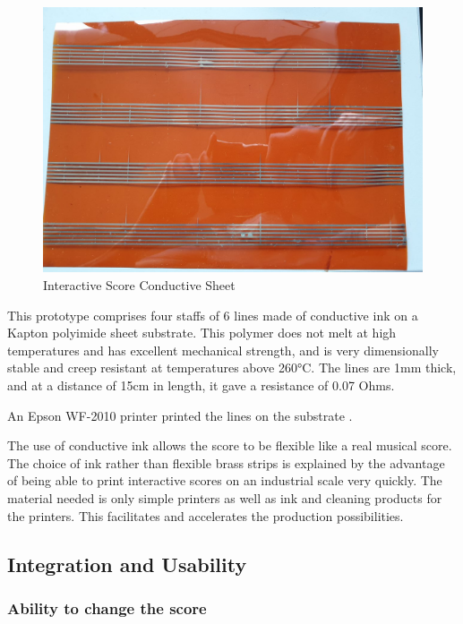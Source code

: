 \begin{figure}[h]
    \centering
    \includegraphics{images/IS_conductive_sheet.jpeg}
    \caption{Interactive Score Conductive Sheet}
    \label{fig:IS_conductive_sheet}
\end{figure}

This prototype comprises four staffs of 6 lines made of conductive ink on a Kapton polyimide sheet substrate. This polymer does not melt at high temperatures and has excellent mechanical strength, and is very dimensionally stable and creep resistant at temperatures above 260°C. The lines are 1mm thick, and at a distance of 15cm in length, it gave a resistance of 0.07 Ohms.

An Epson WF-2010 printer printed the lines on the substrate \cite{adrien2022capacitive_to_notes}.

The use of conductive ink allows the score to be flexible like a real musical score. The choice of ink rather than flexible brass strips is explained by the advantage of being able to print interactive scores on an industrial scale very quickly. The material needed is only simple printers as well as ink and cleaning products for the printers. This facilitates and accelerates the production possibilities.

\subsection{Integration and Usability}

\subsubsection{Ability to change the score}

